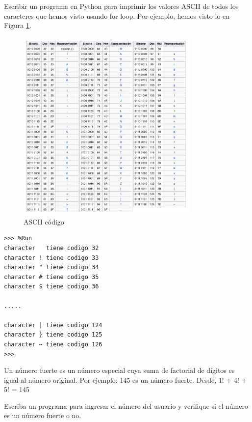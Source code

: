 \newpage

\begin{ejercicio}
Escribir un programa en Python para imprimir los valores ASCII de todos los caracteres que hemos visto usando for loop. Por ejemplo, hemos visto lo en Figura \ref{ascii}.

\begin{figure}
    \centering
    \includegraphics[width=0.8\textwidth]{book/Spanish/03_Conditionals_if_elif_else/images/ASCII.png}
    \caption{ASCII código}
    \label{ascii}
\end{figure}

\begin{small}
\begin{Verbatim}[frame=single, label={\em ejemplo de ejecución}]
>>> %Run 
character   tiene codigo 32
character ! tiene codigo 33
character " tiene codigo 34
character # tiene codigo 35
character $ tiene codigo 36

.....

character | tiene codigo 124
character } tiene codigo 125
character ~ tiene codigo 126
>>> 
\end{Verbatim}
\end{small}
\end{ejercicio}

\begin{ejercicio}
Un número fuerte es un número especial cuya suma de factorial de dígitos es igual al número original.
Por ejemplo: 145 es un número fuerte. Desde, 1! + 4! + 5! = 145

Escriba un programa para ingresar el número del usuario y verifique si el número es un número fuerte o no.
\end{ejercicio}


